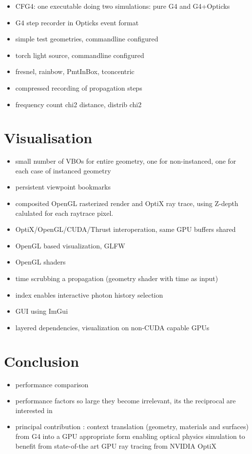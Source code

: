 \documentclass[a4paper]{jpconf}
\begin{document}
\begin{itemize}
\item CFG4: one executable doing two simulations: pure G4 and G4+Opticks 
\item G4 step recorder in Opticks event format
\item simple test geometries, commandline configured 
\item torch light source, commandline configured 
\item fresnel, rainbow, PmtInBox, tconcentric
\item compressed recording of propagation steps
\item frequency count chi2 distance, distrib chi2
\end{itemize}

\section{Visualisation}

\begin{itemize}
\item small number of VBOs for entire geometry, one for non-instanced, one for each case of instanced geometry
\item persistent viewpoint bookmarks 
\item composited OpenGL rasterized render and OptiX ray trace, using Z-depth calulated for each raytrace pixel.
\item OptiX/OpenGL/CUDA/Thrust interoperation, same GPU buffers shared
\item OpenGL based visualization, GLFW
\item OpenGL shaders
\item time scrubbing a propagation (geometry shader with time as input)
\item index enables interactive photon history selection
\item GUI using ImGui\cite{ImGui}
\item layered dependencies, visualization on non-CUDA capable GPUs
\end{itemize}


\section{Conclusion}

\begin{itemize}
\item performance comparison
\item performance factors so large they become irrelevant, its the reciprocal are interested in 
\item principal contribution : context translation (geometry, materials and surfaces) from G4 into a GPU appropriate form
      enabling optical physics simulation to benefit from state-of-the art GPU ray tracing from NVIDIA OptiX
\end{itemize}
\end{document}
